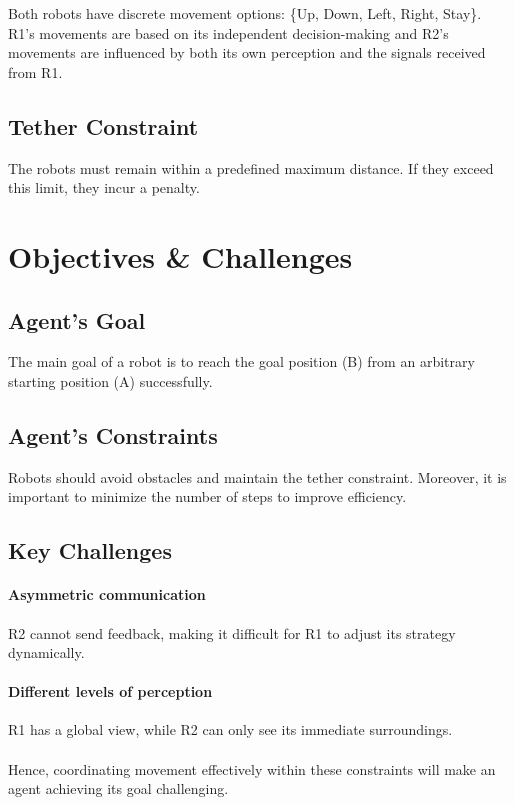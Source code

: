 \documentclass[a4paper,11pt]{article}
\begin{document}
Both robots have discrete movement options: \{Up, Down, Left, Right, Stay\}. \\
R1’s movements are based on its independent decision-making and R2’s movements are influenced by both its own perception and the signals received from R1.

\subsection{Tether Constraint} The robots must remain within a predefined maximum distance. If they exceed this limit, they incur a penalty.

\section{Objectives \& Challenges}

\subsection{Agent's Goal}

The main goal of a robot is to reach the goal position (B) from an arbitrary starting position (A) successfully.

\subsection{Agent's Constraints} 
Robots should avoid obstacles and maintain the tether constraint. Moreover, it is important to minimize the number of steps to improve efficiency.

\subsection{Key Challenges} \paragraph{Asymmetric communication} R2 cannot send feedback, making it difficult for R1 to adjust its strategy dynamically.

\paragraph{Different levels of perception} R1 has a global view, while R2 can only see its immediate surroundings. 

\paragraph{} Hence, coordinating movement effectively within these constraints will make an agent achieving its goal challenging. 
\end{document}
